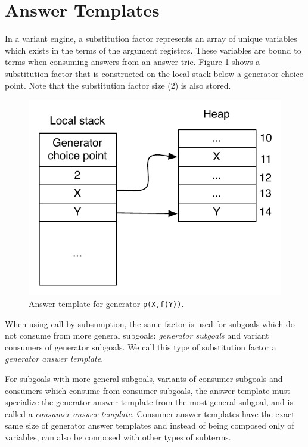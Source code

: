 \section{Answer Templates}

In a variant engine, a substitution factor
represents an array of unique variables which exists in the terms of the argument registers.
These variables are bound to terms when consuming answers from an answer trie.
Figure \ref{fig:answer_template_generator} shows a substitution factor that is constructed
on the local stack below a generator choice point.
Note that the substitution factor size (2) is also stored.

\begin{figure}[ht]
  \centering
    \includegraphics[scale=0.6]{answer_template_generator.pdf}
  \caption{Answer template for generator \texttt{p(X,f(Y))}.}
  \label{fig:answer_template_generator}
\end{figure}

When using call by subsumption, the same factor is used for
subgoals which do not consume from more general subgoals: \textit{generator subgoals}
and variant consumers of generator subgoals.
We call this type of substitution factor a \textit{generator answer template}.

For subgoals with more general subgoals, variants of consumer subgoals and consumers
which consume from consumer subgoals, the answer template must specialize the generator answer template
from the most general subgoal, and is called a \textit{consumer answer template}.
Consumer answer templates have the exact same size of generator answer templates
and instead of being composed only of variables, can also be composed with other types of subterms.

